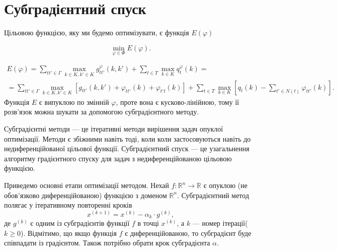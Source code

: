 \section{Субградієнтний спуск}

Цільовою функцією, яку ми будемо оптимізувати, є функція $E(\varphi)$

\begin{equation}
    \min_{\varphi \in \Phi} E(\varphi).
\end{equation}

    \begin{multline*}
    E(\varphi) = \sum\limits_{tt'\in\Gamma}\max\limits_{k\in K, k'\in K}g^{\varphi}_{tt'}(k,k') + 
    \sum\limits_{t\in T}\max\limits_{k\in K}q^{\varphi}_t(k) = \\
    =\sum\limits_{tt'\in\Gamma}\max\limits_{k\in K, k'\in K}[ g_{tt'}(k,k')
    + \varphi_{tt'}(k) + \varphi_{t't}(k)]
    +\sum\limits_{t\in T}\max\limits_{k\in K}\left[ q_t(k) - \sum\limits_{t'\in N(t)} \varphi_{tt'}(k)\right].
  \end{multline*}
Функція $E$ є випуклою по змінній $\varphi$, проте вона є кусково-лінійною,
тому її розв'язок можна шукати за допомогою субградієнтного методу.

Субградієнтні методи \cite{Shor1985, savchynskyy,lopatka_stop_cond} --- це ітеративні методи вирішення задач опуклої оптимізації. 
Методи є збіжними навіть тоді, коли коли застосовуються навіть до недиференційованої цільової функції.
Субградієнтний спуск --- це узагальнення алгоритму градієнтного спуску \cite{chong2013introduction} для задач з недиференційованою 
цільовою функцією.

Приведемо основні етапи оптимізації методом. 
Нехай $f:\mathbb{R}^{n}\rightarrow\mathbb{R}$ є опуклою (не обов'язково диференційованою)
функцією з доменом $\mathbb{R}^{n}$.
Субградієнтний метод полягає у ітеративному повторенні кроків
\begin{equation}
    x^{(k+1)}=x^{(k)}-\alpha_k\cdot g^{(k)},
\end{equation}
де $g^{(k)}$ є одним із субградієнтів функції $f$ в точці $x^{(k)}$, а $k$ --- номер ітерації($k\geq0$).
Відмітимо, що якщо функція $f$ є диференційованою, то субградієнт буде співпадати із градієнтом.
Також потрібно обрати крок субградієнта $\alpha$.

